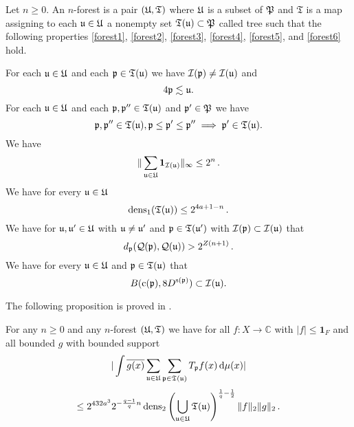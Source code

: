 Let $n\ge 0$.
An $n$-forest is a pair $({\mathfrak U}, \mathfrak{T})$
where ${\mathfrak U}$ is a subset of ${\mathfrak P}$
and $\mathfrak{T}$ is a map assigning to
each ${\mathfrak u}\in {\mathfrak U}$ a nonempty set ${\mathfrak T} ({\mathfrak u})\subset {\mathfrak P}$ called tree
such that the following properties
\eqref{forest1}, \eqref{forest2},
\eqref{forest3},
\eqref{forest4},
\eqref{forest5}, and
\eqref{forest6}
hold.

For each ${\mathfrak u}\in {\mathfrak U}$ and each ${\mathfrak p}\in {\mathfrak T}({\mathfrak u})$
we have ${\mathcal{I}}({\mathfrak p}) \ne {\mathcal{I}}({\mathfrak u})$ and
\begin{equation}\label{forest1}
    4{\mathfrak p}\lesssim {\mathfrak u}.
\end{equation}
For each ${\mathfrak u} \in {\mathfrak U}$ and each ${\mathfrak p},{\mathfrak p}''\in {\mathfrak T}({\mathfrak u})$ and ${\mathfrak p}'\in {\mathfrak P}$
we have
\begin{equation}\label{forest2}
    {\mathfrak p}, {\mathfrak p}'' \in \mathfrak{T}({\mathfrak u}), {\mathfrak p} \leq {\mathfrak p}' \leq {\mathfrak p}'' \implies {\mathfrak p}' \in \mathfrak{T}({\mathfrak u}).
\end{equation}
We have
\begin{equation}\label{forest3}
   \|\sum_{{\mathfrak u}\in {\mathfrak U}} \mathbf{1}_{{\mathcal{I}}({\mathfrak u})}\|_\infty \leq 2^n\,.
\end{equation}
We have for every ${\mathfrak u}\in {\mathfrak U}$
\begin{equation}\label{forest4}
    \operatorname{\operatorname{dens}}_1({\mathfrak T}({\mathfrak u}))\le 2^{4a + 1-n}\, .
\end{equation}
We have for ${\mathfrak u}, {\mathfrak u}'\in {\mathfrak U}$ with ${\mathfrak u}\neq {\mathfrak u}'$ and ${\mathfrak p}\in {\mathfrak T}({\mathfrak u}')$ with ${\mathcal{I}}({\mathfrak p})\subset {\mathcal{I}}({\mathfrak u})$ that
\begin{equation}\label{forest5}
    d_{{\mathfrak p}}({\mathcal{Q}}({\mathfrak p}), {\mathcal{Q}}({\mathfrak u}))>2^{Z(n+1)}\, .
\end{equation}
We have for every ${\mathfrak u}\in {\mathfrak U}$ and ${\mathfrak p}\in {\mathfrak T}({\mathfrak u})$ that
\begin{equation}\label{forest6}
    B({\mathrm{c}}({\mathfrak p}), 8D^{{\mathrm{s}}({\mathfrak p})})\subset {\mathcal{I}}({\mathfrak u}).
\end{equation}


The following proposition is proved in .
\begin{proposition}
\label{forest-operator}
\leanok
{}
For any $n\ge 0$ and any $n$-forest $({\mathfrak U},{\mathfrak T})$ we have for all $f: X \to \mathbb{C}$ with $|f| \le \mathbf{1}_F$ and all bounded $g$ with bounded support
$$
    | \int \overline{g(x)} \sum_{{\mathfrak u}\in {\mathfrak U}} \sum_{{\mathfrak p}\in {\mathfrak T}({\mathfrak u})} T_{{\mathfrak p}} f(x) \, \mathrm{d}\mu(x)|
$$
$$
    \le
    2^{432a^3}2^{-\frac{q-1}{q} n} \operatorname{\operatorname{dens}}_2\left(\bigcup_{{\mathfrak u}\in {\mathfrak U}}{\mathfrak T}({\mathfrak u})\right)^{\frac{1}{q}-\frac{1}{2}} \|f\|_2 \|g\|_2 \,.
$$
\end{proposition}

